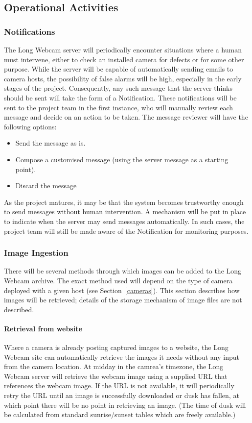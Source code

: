 \documentclass[11pt]{article}
\begin{document}
\subsection{Operational Activities}

\subsubsection{Notifications}
The Long Webcam server will periodically encounter situations where a human must intervene, either to check an installed camera for defects or for some other purpose. While the server will be capable of automatically sending emails to camera hosts, the possibility of false alarms will be high, especially in the early stages of the project. Consequently, any such message that the server thinks should be sent will take the form of a Notification. These notifications will be sent to the project team in the first instance, who will manually review each message and decide on an action to be taken. The message reviewer will have the following options:

\begin{itemize}
\item Send the message as is.
\item Compose a customised message (using the server message as a starting point).
\item Discard the message
\end{itemize}

As the project matures, it may be that the system becomes trustworthy enough to send messages without human intervention. A mechanism will be put in place to indicate when the server may send messages automatically. In such cases, the project team will still be made aware of the Notification for monitoring purposes.

\subsubsection{Image Ingestion}
There will be several methods through which images can be added to the Long Webcam archive. The exact method used will depend on the type of camera deployed with a given host (see Section~\ref{cameras}). This section describes how images will be retrieved; details of the storage mechanism of image files are not described.

\paragraph{Retrieval from website}
Where a camera is already posting captured images to a website, the Long Webcam site can automatically retrieve the images it needs without any input from the camera location. At midday in the camrea's timezone, the Long Webcam server will retrieve the webcam image using a supplied URL that references the webcam image. If the URL is not available, it will periodically retry the URL until an image is successfully downloaded or dusk has fallen, at which point there will be no point in retrieving an image. (The time of dusk will be calculated from standard sunrise/sunset tables which are freely available.)
\end{document}
